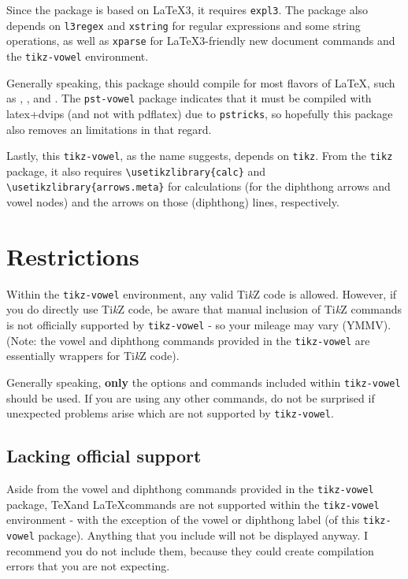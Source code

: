 \documentclass{article}
\newcommand{\pkg}[1]{\texttt{#1}}
\newcommand{\pdfLaTeX}{\hologo{pdfLaTeX}\xspace}
\newcommand{\TikZ}{Ti\textit{k}Z\xspace}
\begin{document}
Since the package is based on \LaTeX3, it requires \pkg{expl3}.  The package also depends on \pkg{l3regex} and \pkg{xstring} for regular expressions and some string operations, as well as \pkg{xparse} for \LaTeX3-friendly new document commands and the \verb|tikz-vowel| environment.

Generally speaking, this package should compile for most flavors of \LaTeX, such as \pdfLaTeX, \LuaLaTeX, and \XeLaTeX.  The \pkg{pst-vowel} package indicates that it must be compiled with latex+dvips (and not with pdflatex) due to \pkg{pstricks}, so hopefully this package also removes an limitations in that regard.

Lastly, this \pkg{tikz-vowel}, as the name suggests, depends on \pkg{tikz}.  From the \pkg{tikz} package, it also requires \verb|\usetikzlibrary{calc}| and \verb|\usetikzlibrary{arrows.meta}| for calculations (for the diphthong arrows and vowel nodes) and the arrows on those (diphthong) lines, respectively.


\section{Restrictions}
\label{sec:Restrictions}

Within the \verb|tikz-vowel| environment, any valid \TikZ code is allowed.  However, if you do directly use \TikZ code, be aware that manual inclusion of \TikZ commands is not officially supported by \pkg{tikz-vowel} - so your mileage may vary (YMMV).  (Note: the vowel and diphthong commands provided in the \pkg{tikz-vowel} are essentially wrappers for \TikZ code).

Generally speaking, \textbf{only} the options and commands included within \pkg{tikz-vowel} should be used.  If you are using any other commands, do not be surprised if unexpected problems arise which are not supported by \pkg{tikz-vowel}.

\subsection{Lacking official support}
\label{sec:Lacking official support}

Aside from the vowel and diphthong commands provided in the \pkg{tikz-vowel} package, \TeX and \LaTeX commands are not supported within the \verb|tikz-vowel| environment - with the exception of the vowel or diphthong label (of this \pkg{tikz-vowel} package).  Anything that you include will not be displayed anyway.  I recommend you do not include them, because they could create compilation errors that you are not expecting.
\end{document}
